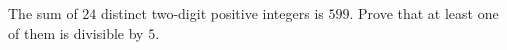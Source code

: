 The sum of $24$ distinct two-digit positive integers is $599$. Prove that at least one of them is divisible by $5$.
